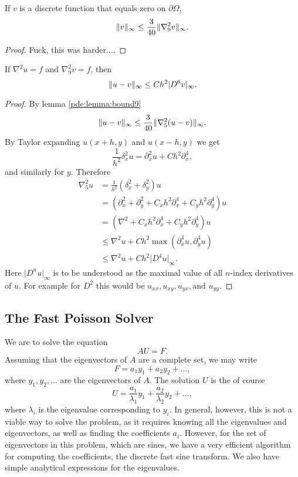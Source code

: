 \begin{lemma}\label{pde:lemma:bound9}
  If $v$ is a discrete function that equals zero on $\partial \Omega$,
  $$
  \lVert v \rVert_\infty \leq \frac{3}{40} \lVert \nabla_9^2 v \rVert_\infty.
  $$
\end{lemma}
\begin{proof}
  Fuck, this was harder....
\end{proof}

\begin{theorem}
If $\nabla^2 u = f$ and $\nabla_9^2 v = f$, then
$$
\lVert u - v \rVert_\infty \leq Ch^2 \lvert D^6 v\rvert_\infty.
$$
\end{theorem}
\begin{proof}
By lemma \ref{pde:lemma:bound9}
$$
\lVert u - v \rVert_\infty \leq \frac{3}{40} \lVert \nabla_5^2 (u  - v) \rVert_\infty.
$$
By Taylor expanding $u(x + h, y)$ and $u(x - h, y)$ we get
$$
\frac{1}{h^2} \delta_x^2 u = \partial_x^2 u + C h^2 \partial_x^4,
$$
and similarly for $y$.
Therefore
\begin{align*}
  \nabla_5^2 u
  &=\frac{1}{h^2} (\delta_x^2 + \delta_y^2) u\\
  &= (\partial_x^2 + \partial_y^2 + C_x h^2 \partial_x^4 + C_y h^2 \partial_y^4) u\\
  &= (\nabla^2 + C_x h^2 \partial_x^4 + C_y h^2 \partial_y^4) u\\
  &\leq \nabla^2 u + C h^2 \max(\partial_x^4 u, \partial_y^4 u)\\
  &\leq \nabla^2 u + C h^2 \lvert D^4 u \rvert_\infty.
\end{align*}
Here $\lvert D^n u\rvert_\infty$ is to be understood as the maximal value of all $n$-index derivatives of $u$.
For example for $D^2$ this would be $u_{xx}, u_{xy}, u_{yx}, \text{and } u_{yy}$.
\end{proof}



\subsection{The Fast Poisson Solver}
We are to solve the equation
$$
A U = F.
$$
Assuming that the eigenvectors of $A$ are a complete set, we may write
$$
F = a_1 y_1 + a_2 y_2 + ...,
$$
where $y_1, y_2, \dots$ are the eigenvectors of $A$.
The solution $U$ is the of course
$$
U =
\frac{a_1}{\lambda_1} y_1
+ \frac{a_2}{\lambda_2} y_2
+ \dots,
$$
where $\lambda_i$ is the eigenvalue corresponding to $y_i$.
In general, however, this is not a viable way to solve the problem, as it requires knowing all the eigenvalues and eigenvectors, as well as finding the coefficients $a_i$.
However, for the set of eigenvectors in this problem, which are sines, we have a very efficient algorithm for computing the coefficients, the discrete fast sine transform.
We also have simple analytical expressions for the eigenvalues.

